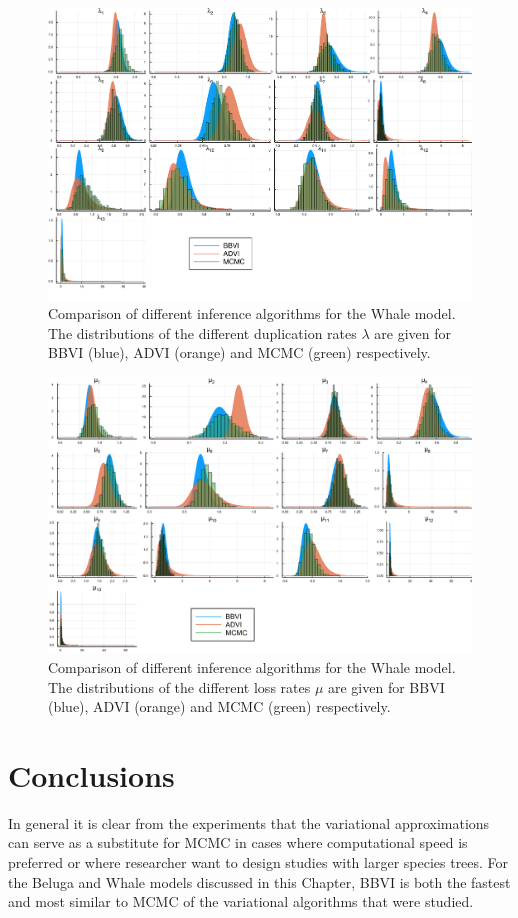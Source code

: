 \begin{figure}
	\centering
	\includegraphics[width=6in]{images/whale/whale-distribution-lambda.pdf}
	\caption[Whale experiment $\lambda$ distributions.]{Comparison of different inference algorithms for the Whale model. The distributions of the different duplication rates $\lambda$ are given for BBVI (blue), ADVI (orange) and MCMC (green) respectively.}
    \label{fig:whale-lambda}
\end{figure}

\begin{figure}
	\centering
	\includegraphics[width=6in]{images/whale/whale-distribution-mu.eps}
	\caption[Whale experiment $\mu$ distributions.]{Comparison of different inference algorithms for the Whale model. The distributions of the different loss rates $\mu$ are given for BBVI (blue), ADVI (orange) and MCMC (green) respectively.}
    \label{fig:whale-mu}
\end{figure}


\section{Conclusions}
In general it is clear from the experiments that the variational approximations can serve as a substitute for MCMC in cases where computational speed is preferred or where researcher want to design studies with larger species trees. For the Beluga and Whale models discussed in this Chapter, BBVI is both the fastest and most similar to MCMC of the variational algorithms that were studied.